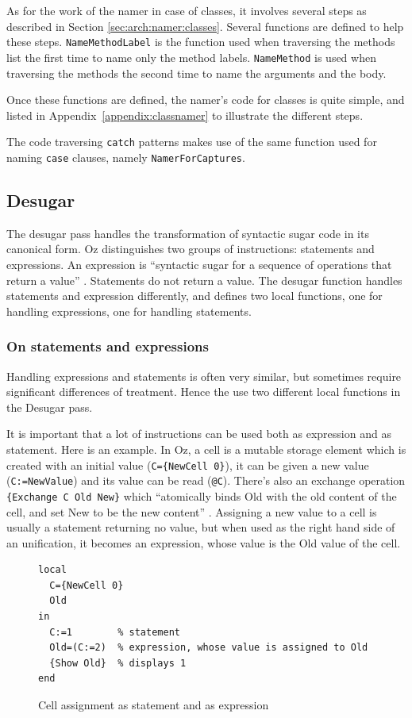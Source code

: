 \documentclass[a4paper]{memoir}
\begin{document}
As for the work of the namer in case of classes, it involves several steps as described
in Section \ref{sec:arch:namer:classes}.
Several functions are defined to help these steps. \lstinline!NameMethodLabel!
is the function used when traversing the methods list the first time to name
only the method labels.
\lstinline!NameMethod! is used when traversing the methods the second time to
name the arguments and the body.

Once these functions are defined, the namer's code for classes is quite simple,
and listed in Appendix~\ref{appendix:classnamer} to illustrate the different steps.


The code traversing \lstinline!catch! patterns makes use of the same
function used for naming \lstinline!case! clauses, namely
\lstinline!NamerForCaptures!.



\subsection{Desugar}\label{sec:arch:desugar}
The desugar pass handles the transformation of syntactic sugar code in its canonical form.
Oz distinguishes two groups of instructions: statements and expressions. An expression is ``syntactic sugar for a sequence of operations that return a value'' \cite{CTMCP}. Statements do not return a value.
The desugar function handles statements and expression differently, and defines two local functions, one for handling expressions, one for handling statements.
\subsubsection{On statements and expressions}
Handling expressions and statements is often very similar, but sometimes require significant differences of treatment. Hence the use two different local functions in the Desugar pass.

It is important that a lot of instructions can be used both as expression and as
statement. Here is an example.
In Oz, a cell is a mutable storage element which is created with an initial value (\lstinline!C={NewCell 0}!), it can be given a new value (\lstinline!C:=NewValue!) and its value can be read (\lstinline!@C!). There's also an exchange operation \lstinline!{Exchange C Old New}! which ``atomically binds Old with the old content of the cell, and set New to be the new content'' \cite{CTMCP}.%
Assigning a new value to a cell is usually a statement returning no value, but
when used as the right hand side of an unification, it becomes an expression,
whose value is the Old value of the cell.
\begin{figure}[h]
\begin{lstlisting}
local
  C={NewCell 0}
  Old
in
  C:=1        % statement
  Old=(C:=2)  % expression, whose value is assigned to Old
  {Show Old}  % displays 1
end

\end{lstlisting}
\caption{Cell assignment as statement and as expression}
\label{fig:statement_and_expression1}
\end{figure}
\end{document}
